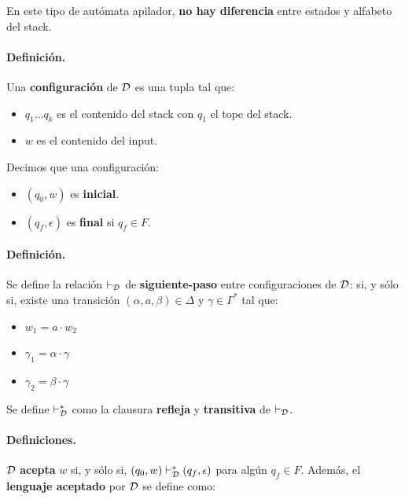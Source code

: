 En este tipo de autómata apilador, \textbf{no hay diferencia} entre estados y alfabeto del stack.

\paragraph*{Definición.} Una \textbf{configuración} de $\mathcal{D}$ es una tupla
tal que:
\begin{itemize}
    \item $q_1\ldots q_k$ es el contenido del stack con $q_1$ el tope del stack.
    \item $w$ es el contenido del input.
\end{itemize}
Decimos que una configuración:
\begin{itemize}
    \item $(q_0,w)$ es \textbf{inicial}.
    \item $(q_f,\epsilon)$ es \textbf{final} si $q_f \in F$.
\end{itemize}

\paragraph*{Definición.} Se define la relación $\vdash_{\mathcal{D}}$ de \textbf{siguiente-paso} entre configuraciones de $\mathcal{D}$:
si, y sólo si, existe una transición $\left(\alpha, a, \beta\right) \in \Delta \text { y } \gamma \in \Gamma^*$ tal que:
\begin{itemize}
    \item $w_1 = a \cdot w_2$
    \item $\gamma_1 = \alpha\cdot \gamma$
    \item $\gamma_2 = \beta \cdot \gamma$
\end{itemize}

Se define $\vdash_{\mathcal{D}}^*$ como la clausura \textbf{refleja} y \textbf{transitiva} de $\vdash_{\mathcal{D}}$.

\paragraph*{Definiciones.} $\mathcal{D}$ \textbf{acepta} $w$ si, y sólo si, $(q_0,w) \vdash_{\mathcal{D}}^* (q_f,\epsilon)$ para algún $q_f \in F$. Además, el \textbf{lenguaje aceptado} por $\mathcal{D}$ se define como:

